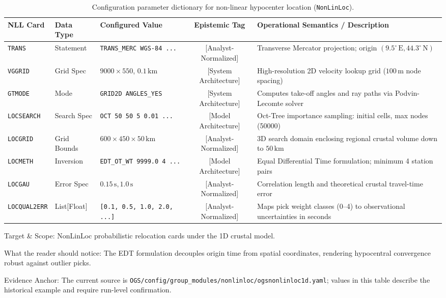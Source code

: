 \begin{table}[htbp]
  \centering
  \small
  \caption{Configuration parameter dictionary for non-linear hypocenter location (\texttt{NonLinLoc}).}
  \label{tab:app_nll_dictionary}
  \begin{threeparttable}
    \begin{tabularx}{\linewidth}{l l l c X}
      \toprule
      \textbf{NLL Card} & \textbf{Data Type} & \textbf{Configured Value} & \textbf{Epistemic Tag} & \textbf{Operational Semantics / Description} \\
      \midrule
      \texttt{TRANS} & Statement & \texttt{TRANS\_MERC WGS-84 ...} & [Analyst-Normalized] & Transverse Mercator projection; origin $(9.5^\circ\,\mathrm{E}, 44.3^\circ\,\mathrm{N})$ \\
      \texttt{VGGRID} & Grid Spec & $9000 \times 550$, $0.1\,\unit{\kilo\meter}$ & [System Architecture] & High-resolution 2D velocity lookup grid ($100\,\unit{\meter}$ node spacing) \\
      \texttt{GTMODE} & Mode & \texttt{GRID2D ANGLES\_YES} & [System Architecture] & Computes take-off angles and ray paths via Podvin-Lecomte solver \\
      \texttt{LOCSEARCH} & Search Spec & \texttt{OCT 50 50 5 0.01 ...} & [Model Architecture] & Oct-Tree importance sampling: initial cells, max nodes (\num{50000}) \\
      \texttt{LOCGRID} & Grid Bounds & $600 \times 450 \times 50\,\unit{\kilo\meter}$ & [Analyst-Normalized] & 3D search domain enclosing regional crustal volume down to $50\,\unit{\kilo\meter}$ \\
      \texttt{LOCMETH} & Inversion & \texttt{EDT\_OT\_WT 9999.0 4 ...} & [Model Architecture] & Equal Differential Time formulation; minimum 4 station pairs \\
      \texttt{LOCGAU} & Error Spec & $0.15\,\unit{\second}, 1.0\,\unit{\second}$ & [Analyst-Normalized] & Correlation length and theoretical crustal travel-time error \\
      \texttt{LOCQUAL2ERR} & List[Float] & \texttt{[0.1, 0.5, 1.0, 2.0, ...]} & [Analyst-Normalized] & Maps pick weight classes (0--4) to observational uncertainties in seconds \\
      \bottomrule
    \end{tabularx}
    \begin{tablenotes}[flushleft]
      \footnotesize
      \item Target \& Scope: NonLinLoc probabilistic relocation cards under the 1D crustal model.
      \item What the reader should notice: The EDT formulation decouples origin time from spatial coordinates, rendering hypocentral convergence robust against outlier picks.
      \item Evidence Anchor: The current source is \texttt{OGS/config/group\_modules/nonlinloc/ogsnonlinloc1d.yaml}; values in this table describe the historical example and require run-level confirmation.
    \end{tablenotes}
  \end{threeparttable}
\end{table}

